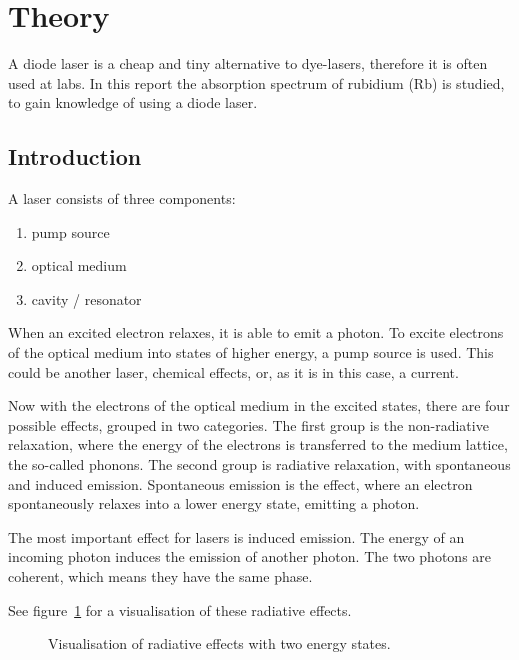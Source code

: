 \section{Theory}\label{theory}

A diode laser is a cheap and tiny alternative to dye-lasers, therefore it is often used at labs.
In this report the absorption spectrum of rubidium (Rb) is studied, to gain knowledge of using
a diode laser.

\subsection{Introduction}\label{introduction}

A laser consists of three components:

\begin{enumerate}
  \item pump source
  \item optical medium
  \item cavity / resonator
\end{enumerate}

When an excited electron relaxes, it is able to emit a photon.
To excite electrons of the optical medium into states of higher energy, a pump source is used.
This could be another laser, chemical effects, or, as it is in this case, a current.

Now with the electrons of the optical medium in the excited states, there are four possible
effects, grouped in two categories.
The first group is the non-radiative relaxation, where the energy of the electrons is transferred
to the medium lattice, the so-called phonons.
The second group is radiative relaxation, with spontaneous and induced emission.
Spontaneous emission is the effect, where an electron spontaneously relaxes into a lower energy
state, emitting a photon.

The most important effect for lasers is induced emission.
The energy of an incoming photon induces the emission of another photon.
The two photons are coherent, which means they have the same phase.

See figure~\ref{fig:two_niveau_laser} for a visualisation of these radiative effects.
\begin{figure}[ht]
  \centering
  
  \caption{Visualisation of radiative effects with two energy states\cite{anleitung_hene}.}%
  \label{fig:two_niveau_laser}
\end{figure}

